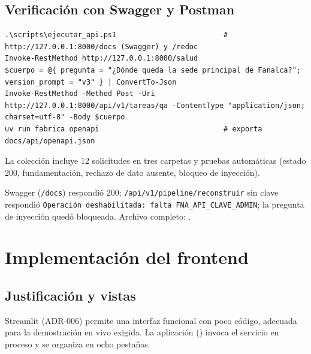 \section{Verificación con Swagger y Postman}
\begin{lstlisting}[style=ps]
.\scripts\ejecutar_api.ps1                         # http://127.0.0.1:8000/docs (Swagger) y /redoc
Invoke-RestMethod http://127.0.0.1:8000/salud
$cuerpo = @{ pregunta = "¿Dónde queda la sede principal de Fanalca?"; version_prompt = "v3" } | ConvertTo-Json
Invoke-RestMethod -Method Post -Uri http://127.0.0.1:8000/api/v1/tareas/qa -ContentType "application/json; charset=utf-8" -Body $cuerpo
uv run fabrica openapi                             # exporta docs/api/openapi.json
\end{lstlisting}
La colección  incluye 12 solicitudes en tres carpetas y
pruebas automáticas (estado 200, fundamentación, rechazo de dato ausente, bloqueo de inyección).

\begin{evidencia}

Swagger (\texttt{/docs}) respondió 200; \texttt{/api/v1/pipeline/reconstruir} sin clave respondió
\texttt{Operación deshabilitada: falta FNA\_API\_CLAVE\_ADMIN}; la pregunta de inyección quedó bloqueada.
Archivo completo: .
\end{evidencia}

\chapter{Implementación del frontend}\label{cap:frontend}

\section{Justificación y vistas}
Streamlit (ADR-006) permite una interfaz funcional con poco código, adecuada para la demostración en vivo exigida.
La aplicación () invoca el servicio en proceso y se organiza en ocho pestañas.

